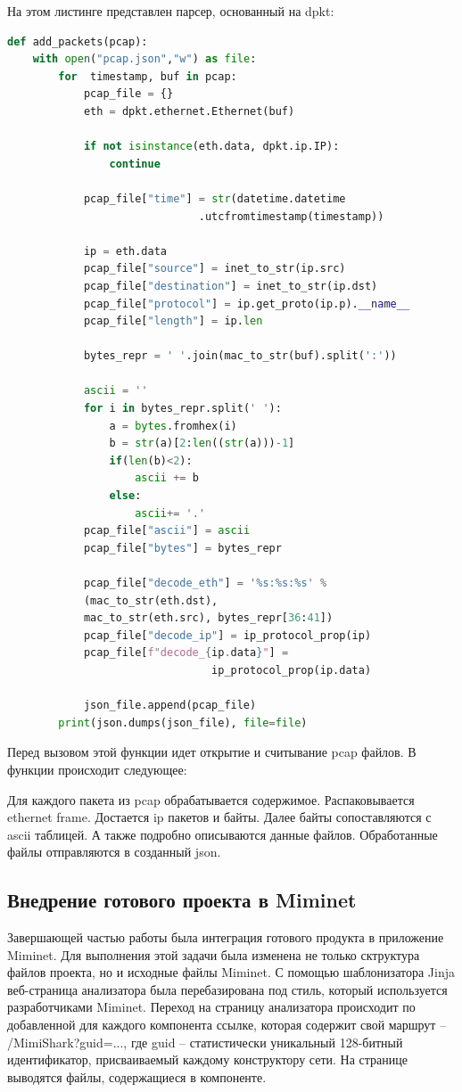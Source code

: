 На этом листинге представлен парсер, основанный на dpkt:
\begin{lstlisting}[caption=\textbf{Работа парсера pcap файлов}, language=Python, frame=single]
  def add_packets(pcap):
    with open("pcap.json","w") as file:
        for  timestamp, buf in pcap:
            pcap_file = {}
            eth = dpkt.ethernet.Ethernet(buf)

            if not isinstance(eth.data, dpkt.ip.IP):
                continue
            
            pcap_file["time"] = str(datetime.datetime
                              .utcfromtimestamp(timestamp))

            ip = eth.data
            pcap_file["source"] = inet_to_str(ip.src)
            pcap_file["destination"] = inet_to_str(ip.dst)
            pcap_file["protocol"] = ip.get_proto(ip.p).__name__
            pcap_file["length"] = ip.len
            
            bytes_repr = ' '.join(mac_to_str(buf).split(':'))

            ascii = ''
            for i in bytes_repr.split(' '):
                a = bytes.fromhex(i)
                b = str(a)[2:len((str(a)))-1]
                if(len(b)<2):
                    ascii += b
                else:
                    ascii+= '.'
            pcap_file["ascii"] = ascii
            pcap_file["bytes"] = bytes_repr

            pcap_file["decode_eth"] = '%s:%s:%s' % 
            (mac_to_str(eth.dst), 
            mac_to_str(eth.src), bytes_repr[36:41])
            pcap_file["decode_ip"] = ip_protocol_prop(ip)
            pcap_file[f"decode_{ip.data}"] = 
                                ip_protocol_prop(ip.data)

            json_file.append(pcap_file)
        print(json.dumps(json_file), file=file)
\end{lstlisting}
Перед вызовом этой функции идет открытие и считывание pcap файлов. В функции происходит следующее: 

Для каждого пакета из pcap обрабатывается содержимое.
Распаковывается ethernet frame. Достается ip пакетов и байты. Далее байты сопоставляются с ascii таблицей.
А также подробно описываются данные файлов.
Обработанные файлы отправляются в созданный json.

\subsection{Внедрение готового проекта в Miminet}
Завершающей частью работы была интеграция готового продукта в приложение Miminet.
Для выполнения этой задачи была изменена не только сктруктура файлов проекта, но и исходные файлы Miminet. 
С помощью шаблонизатора Jinja веб-страница анализатора была перебазирована под стиль, который используется разработчиками Miminet.
Переход на страницу анализатора происходит по добавленной для каждого компонента ссылке, которая содержит
свой маршрут -- 
\newline
/MimiShark?guid=...,
где guid --  статистически уникальный 128-битный идентификатор, присваиваемый каждому конструктору сети.
На странице выводятся файлы, содержащиеся в компоненте.


